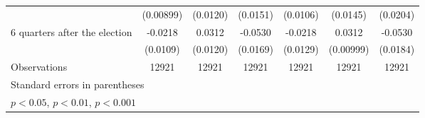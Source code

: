 \begin{table}[!ht]
\begin{tabular}{l*{6}{c}}
                    &   (0.00899)         &    (0.0120)         &    (0.0151)         &    (0.0106)         &    (0.0145)         &    (0.0204)         \\
[1em]
 6 quarters after the election&     -0.0218\sym{*}  &      0.0312\sym{**} &     -0.0530\sym{**} &     -0.0218         &      0.0312\sym{**} &     -0.0530\sym{**} \\
                    &    (0.0109)         &    (0.0120)         &    (0.0169)         &    (0.0129)         &   (0.00999)         &    (0.0184)         \\
\hline
Observations        &       12921         &       12921         &       12921         &       12921         &       12921         &       12921         \\
\hline\hline
\multicolumn{7}{l}{\footnotesize Standard errors in parentheses}\\
\multicolumn{7}{l}{\footnotesize \sym{*} \(p<0.05\), \sym{**} \(p<0.01\), \sym{***} \(p<0.001\)}\\
\end{tabular}
\end{table}

